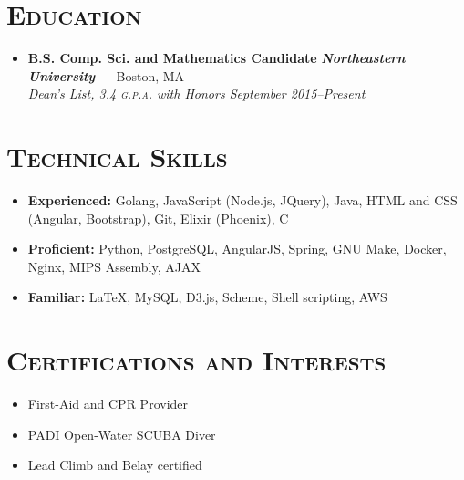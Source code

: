 \documentclass{article}
\begin{document}
\section*{\textsc{Education}}
\begin{itemize}[label={},leftmargin=*]
\item \textbf{B.S. Comp. Sci. and Mathematics Candidate} \hfill \textit{\textbf{Northeastern University}} --- Boston, MA \\ \em{Dean's List}, 3.4 \textsc{g.p.a.} with Honors \hfill {\em September 2015--Present}
\end{itemize}



\section*{\textsc{Technical Skills}}
\begin{itemize}[label={},leftmargin=*]
\item \textbf{Experienced:} Golang, JavaScript (Node.js, JQuery), Java, HTML and CSS (Angular, Bootstrap), Git, Elixir (Phoenix), C
\item \textbf{Proficient:} Python, PostgreSQL, AngularJS, Spring, GNU Make, Docker, Nginx, MIPS Assembly, AJAX
\item \textbf{Familiar:} LaTeX, MySQL, D3.js, Scheme, Shell scripting, AWS
\end{itemize}



\section*{\textsc{Certifications and Interests}}
\begin{itemize}[label={$\bullet$}]
\item First-Aid and CPR Provider
\item PADI Open-Water SCUBA Diver
\item Lead Climb and Belay certified
\end{itemize}
\end{document}
